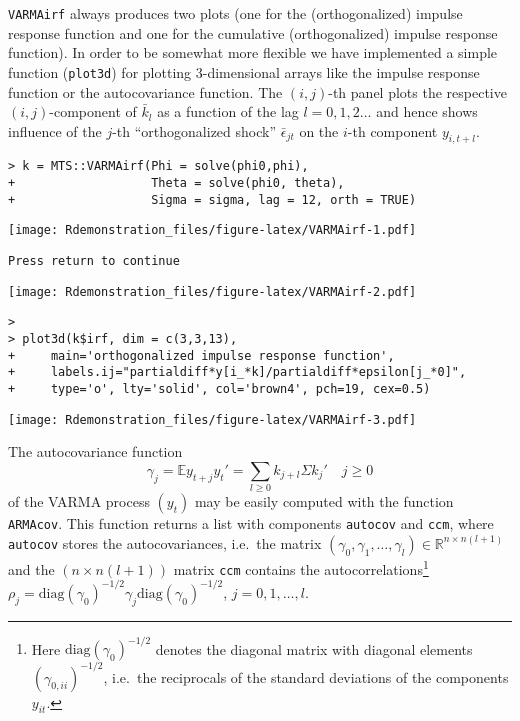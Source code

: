 \documentclass[]{article}
\let\rmarkdownfootnote\footnote%
\def\footnote{\protect\rmarkdownfootnote}
\begin{document}
\texttt{VARMAirf} always produces two plots (one for the
(orthogonalized) impulse response function and one for the cumulative
(orthogonalized) impulse response function). In order to be somewhat
more flexible we have implemented a simple function (\texttt{plot3d})
for plotting \(3\)-dimensional arrays like the impulse response function
or the autocovariance function. The \((i,j)\)-th panel plots the
respective \((i,j)\)-component of \(\bar{k}_l\) as a function of the lag
\(l=0,1,2\ldots\) and hence shows influence of the \(j\)-th
``orthogonalized shock'' \(\bar{\epsilon}_{jt}\) on the \(i\)-th
component \(y_{i,t+l}\).

\begin{verbatim}
> k = MTS::VARMAirf(Phi = solve(phi0,phi), 
+                   Theta = solve(phi0, theta), 
+                   Sigma = sigma, lag = 12, orth = TRUE)
\end{verbatim}

\texttt{[image: Rdemonstration\_files/figure-latex/VARMAirf-1.pdf]}

\begin{verbatim}
Press return to continue  
\end{verbatim}

\texttt{[image: Rdemonstration\_files/figure-latex/VARMAirf-2.pdf]}

\begin{verbatim}
> 
> plot3d(k$irf, dim = c(3,3,13), 
+     main='orthogonalized impulse response function', 
+     labels.ij="partialdiff*y[i_*k]/partialdiff*epsilon[j_*0]",
+     type='o', lty='solid', col='brown4', pch=19, cex=0.5)
\end{verbatim}

\texttt{[image: Rdemonstration\_files/figure-latex/VARMAirf-3.pdf]}

The autocovariance function \[
\gamma_j = \mathbb{E}y_{t+j} y_t' = \sum_{l\geq 0} k_{j+l}\Sigma k_j' \quad j\geq 0
\] of the VARMA process \((y_t)\) may be easily computed with the
function \texttt{ARMAcov}. This function returns a list with components
\texttt{autocov} and \texttt{ccm}, where \texttt{autocov} stores the
autocovariances, i.e.~the matrix
\((\gamma_0,\gamma_1,\ldots,\gamma_l)\in\mathbb{R}^{n\times n(l+1)}\)
and the \((n\times n(l+1))\) matrix \texttt{ccm} contains the
autocorrelations\footnote{Here \(\mbox{diag}(\gamma_0)^{-1/2}\) denotes
  the diagonal matrix with diagonal elements \((\gamma_{0,ii})^{-1/2}\),
  i.e.~the reciprocals of the standard deviations of the components
  \(y_{it}\).}
\(\rho_j = \mbox{diag}(\gamma_0)^{-1/2} \gamma_j \mbox{diag}(\gamma_0)^{-1/2}\),
\(j=0,1,\ldots,l\).
\end{document}

